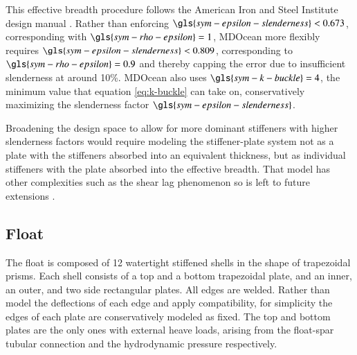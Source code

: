 This effective breadth procedure follows the American Iron and Steel Institute design manual \citep{american_iron_and_steel_institute_cold-formed_1991}.
Rather than enforcing $\gls{sym-epsilon-slenderness}<0.673$, corresponding with $\gls{sym-rho-epsilon}=1$, MDOcean more flexibly requires $\gls{sym-epsilon-slenderness}<0.809$, corresponding to $\gls{sym-rho-epsilon}=0.9$ and thereby capping the error due to insufficient slenderness at around 10\%.
MDOcean also uses $\gls{sym-k-buckle}=4$, the minimum value that equation \eqref{eq:k-buckle} can take on, conservatively maximizing the slenderness factor $\gls{sym-epsilon-slenderness}$.

Broadening the design space to allow for more dominant stiffeners with higher slenderness factors would require modeling the stiffener-plate system not as a plate with the stiffeners absorbed into an equivalent thickness, but as individual stiffeners with the plate absorbed into the effective breadth.
That model has other complexities such as the shear lag phenomenon so is left to future extensions \citep{wierzbicki_lecture_2013,american_iron_and_steel_institute_cold-formed_1991}.


\subsection{Float}
The float is composed of 12 watertight stiffened shells in the shape of trapezoidal prisms.
Each shell consists of a top and a bottom trapezoidal plate, and an inner, an outer, and two side rectangular plates.
All edges are welded.
Rather than model the deflections of each edge and apply compatibility, for simplicity the edges of each plate are conservatively modeled as fixed.
The top and bottom plates are the only ones with external heave loads, arising from the float-spar tubular connection and the hydrodynamic pressure respectively.

